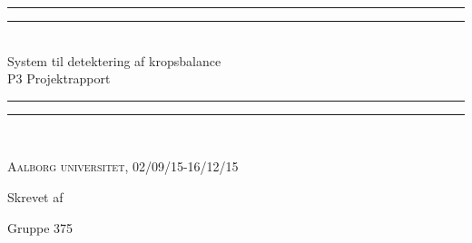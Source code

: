 \clearpage
\thispagestyle{empty}




\begin{center}
\vspace*{\baselineskip}
\rule{\textwidth}{1.6pt}\vspace*{-\baselineskip}\vspace*{2pt} %
\rule{\textwidth}{0.4pt}\\[\baselineskip] %

{\LARGE System til detektering af kropsbalance\\[0.3\baselineskip] \large P3 Projektrapport}\\[0.2\baselineskip] %

\rule{\textwidth}{0.4pt}\vspace*{-\baselineskip}\vspace{3.2pt} %
\rule{\textwidth}{1.6pt}\\[\baselineskip] %

\vspace*{3\baselineskip}

\scshape %
Aalborg universitet,  02/09/15-16/12/15 \par %

\vspace*{2\baselineskip} %

Skrevet af \\[\baselineskip]
{\Large Gruppe 375\par}
\end{center} %

